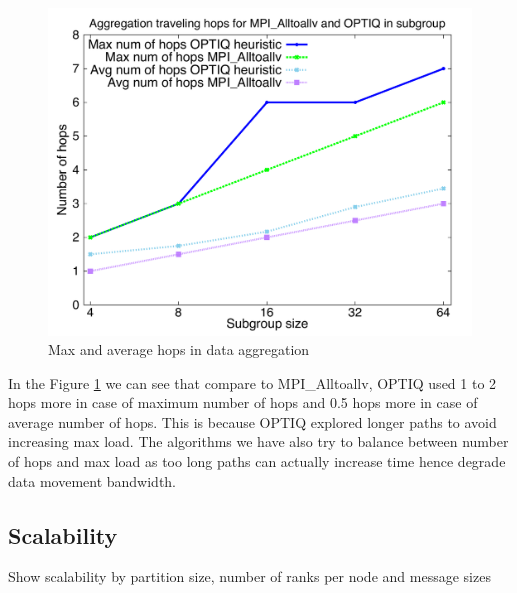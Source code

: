 \begin{figure}[!htb]
\vspace{-0.1in}
\centering
\includegraphics[scale=0.30]{figures/hop.pdf}
\vspace{-0.1in}
\caption{Max and average hops in data aggregation}
\vspace{-0.1in}
\label{fig:agghop}
\end{figure}

In the Figure \ref{fig:agghop} we can see that compare to MPI\_Alltoallv, OPTIQ used 1 to 2 hops more in case of maximum number of hops and 0.5 hops more in case of average number of hops. This is because OPTIQ explored longer paths to avoid increasing max load. The algorithms we have also try to balance between number of hops and max load as too long paths can actually increase time hence degrade data movement bandwidth.

\subsection{Scalability}
Show scalability by partition size, number of ranks per node and message sizes

